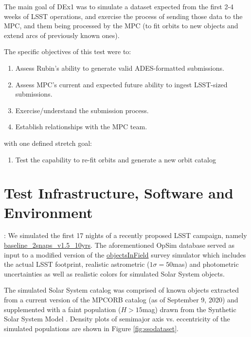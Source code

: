 The main goal of DEx1 was to simulate a dataset expected from the first 2-4 weeks of LSST operations, and exercise the process of sending those data to the MPC, and them being processed by the MPC (to fit orbits to new objects and extend arcs of previously known ones).

The specific objectives of this test were to:
\begin{enumerate}
	\item Assess Rubin's ability to generate valid ADES-formatted submissions.
	\item Assess MPC’s current and expected future ability to ingest LSST-sized submissions.
	\item Exercise/understand the submission process.
	\item Establish relationships with the MPC team.
\end{enumerate}

with one defined stretch goal:
\begin{enumerate}
	\item Test the capability to re-fit orbits and generate a new orbit catalog
\end{enumerate}
\newpage


\section{Test Infrastructure, Software and Environment}
\label{sec:setup}

: We simulated the first 17 nights of a recently proposed LSST campaign, namely \href{http://astro-lsst-01.astro.washington.edu:8081/allMetricResults?runId=13}{baseline\_2snaps\_v1.5\_10yrs}. The aforementioned OpSim database served as input to a modified version of the \href{https://github.com/AsteroidSurveySimulator/objectsInField}{objectsInField} survey simulator which includes the actual LSST footprint, realistic astrometric ($1\sigma=50$mas) and photometric uncertainties as well as realistic colors for simulated Solar System objects.

The simulated Solar System catalog was comprised of known objects extracted from a current version of the MPCORB catalog (as of September 9, 2020) and supplemented with a faint population ($H>15$mag) drawn from the Synthetic Solar System Model \citep[S3M,][]{2011PASP..123..423G}. Density plots of semimajor axis vs. eccentricity of the simulated populations are shown in Figure \ref{fig:ssodataset}.

